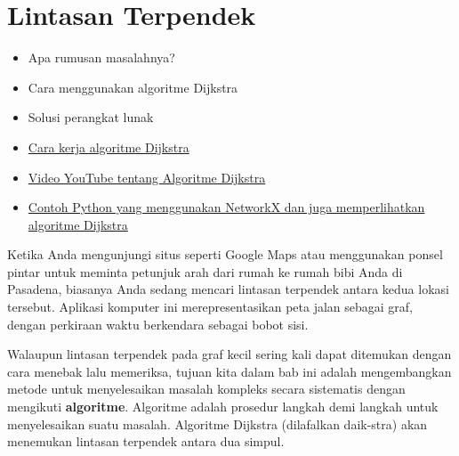 \section{Lintasan Terpendek}
\label{sec:gt-shortest-path}
\begin{outcome}
\begin{itemize}
\item Apa rumusan masalahnya?
\item Cara menggunakan algoritme Dijkstra
\item Solusi perangkat lunak
\end{itemize}
\end{outcome}
\begin{resource}
\begin{itemize}
\item \href{https://www.youtube.com/watch?v=EFg3u_E6eHU&ab_channel=SpanningTree}{Cara kerja algoritme Dijkstra}
\item \href{https://youtu.be/EFg3u_E6eHU}{Video YouTube tentang Algoritme Dijkstra}
\item \href{https://github.com/open-optimization/open-optimization-or-book/blob/master/instructive-code/networkx%20example%20-%20Dijkstra's%20Algorithm.ipynb}{Contoh Python yang menggunakan NetworkX dan juga memperlihatkan algoritme Dijkstra}
\end{itemize}
\end{resource}
Ketika Anda mengunjungi situs seperti Google Maps atau menggunakan ponsel pintar untuk meminta petunjuk arah dari rumah ke rumah bibi Anda di Pasadena, biasanya Anda sedang mencari lintasan terpendek antara kedua lokasi tersebut.  Aplikasi komputer ini merepresentasikan peta jalan sebagai graf, dengan perkiraan waktu berkendara sebagai bobot sisi.

Walaupun lintasan terpendek pada graf kecil sering kali dapat ditemukan dengan cara menebak lalu memeriksa, tujuan kita dalam bab ini adalah mengembangkan metode untuk menyelesaikan masalah kompleks secara sistematis dengan mengikuti \textbf{algoritme}.  Algoritme adalah prosedur langkah demi langkah untuk menyelesaikan suatu masalah.  Algoritme Dijkstra (dilafalkan daik-stra) akan menemukan lintasan terpendek antara dua simpul.

